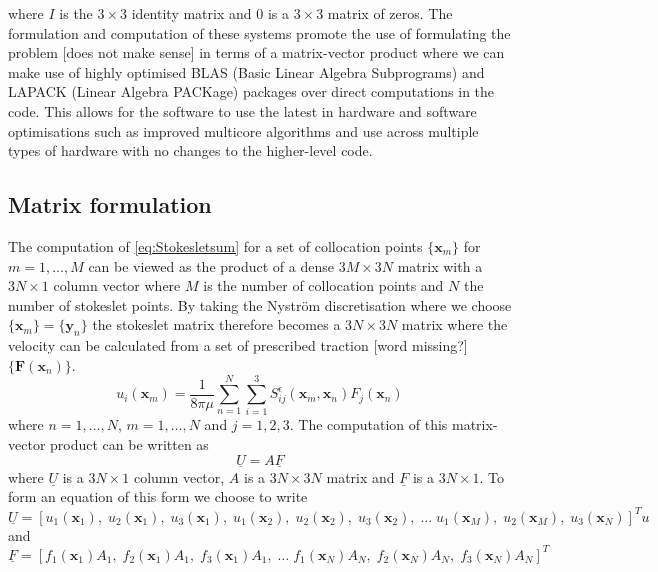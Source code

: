 where $I$ is the $3\times 3$ identity matrix and $0$ is a $3\times 3$ matrix of zeros. The formulation and computation of these systems promote the use of formulating the problem [does not make sense] in terms of a matrix-vector product where we can make use of highly optimised BLAS (Basic Linear Algebra Subprograms) and LAPACK (Linear Algebra PACKage) packages over direct computations in the code. This allows for the software to use the latest in hardware and software optimisations such as improved multicore algorithms and use across multiple types of hardware with no changes to the higher-level code.

\subsection{Matrix formulation}
The computation of \cref{eq:Stokesletsum} for a set of collocation points $\{\bm{x}_m\}$  for $m = 1,...,M$ can be viewed as the product of a dense $3M \times 3N$ matrix with a $3N \times 1$ column vector where $M$ is the number of collocation points and $N$ the number of stokeslet points. By taking the Nyström discretisation where we choose $\{\bm{x}_m\} = \{\bm{y}_n\}$ the stokeslet matrix therefore becomes a $3N \times 3N$ matrix where the velocity can be calculated from a set of prescribed traction [word missing?] $\{\bm{F}(\bm{x}_n)\}$. 
\begin{equation}
\label{eq:Nystrom}
    u_{i}\left(\bm{x}_m\right)=\frac{1}{8 \pi \mu} \sum_{n=1}^{N} \sum_{i=1}^{3} S_{i j}^{\epsilon}\left(\bm{x}_m, {\bm{x}}_{n}\right) {F}_{j}({\bm{x}}_{n})
\end{equation}
where $n=1,\dots,N$, $m=1,\dots,N$ and $j=1,2,3$. The computation of this matrix-vector product can be written as 
\begin{equation}
\label{eq:matrixvectorproduct}
    \underline{U} = A \underline{F}
\end{equation}
where $\underline{U}$ is a $3N \times 1$ column vector, $A$ is a $3N \times 3N$ matrix and $\underline{F}$ is a $3N \times 1$. To form an equation of this form we choose to write 
\small
\begin{equation*}
    \underline{U} = [u_1({\bm{x}}_{1}), \; u_2({\bm{x}}_{1}), \; u_3({\bm{x}}_{1}), \; u_1({\bm{x}}_{2}), \; u_2({\bm{x}}_{2}), \; u_3({\bm{x}}_{2}), \; \dots \; u_1({\bm{x}}_{M}), \; u_2({\bm{x}}_{M}), \; u_3({\bm{x}}_{N})]^{T}u
\end{equation*}
\normalsize
and 
\small
\begin{equation*}
    \underline{F} = [{f}_{1}({\bm{x}}_{1})A_1, \; {f}_{2}({\bm{x}}_{1})A_1, \; {f}_{3}({\bm{x}}_{1})A_1,\; \dots \; {f}_{1}({\bm{x}}_{N})A_N, \; {f}_{2}({\bm{x}}_{N})A_N, \; f_{3}({\bm{x}}_{N})A_N]^{T}
\end{equation*}
